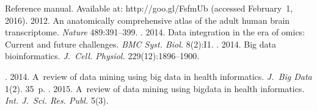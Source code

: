 \begin{multicols}{2}
{{\begin{thebibliography}{99}
Reference manual. Available at: {\sf 
http://goo.gl/FsfmUb} (accessed February~1, 2016).
 2012. An anatomically 
comprehensive atlas of the adult human brain transcriptome. \textit{Nature} 489:391--399.
. 2014. Data integration in the era of omics: Current and future 
challenges. \textit{BMC Syst. Biol.} 8(2):I1.
. 2014. Big data bioinformatics. 
\textit{J.~Cell. Physiol.} 229(12):1896--1900.

. 2014. A~review of data mining using big data in health 
informatics. \textit{J.~Big Data} 1(2).  35~p.
. 2015. A~review of data mining using bigdata in health 
informatics. \textit{Int. J.~Sci. Res. Publ.} 5(3).


\end{thebibliography}}}
\end{multicols}
